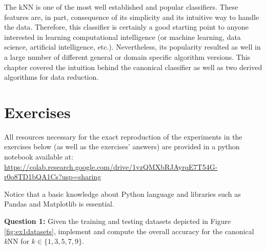 The kNN is one of the most well established and popular classifiers. These features are, in part, consequence of its simplicity and its intuitive way to handle the data. Therefore, this classifier is certainly a good starting point to anyone interested in learning computational intelligence (or machine learning, data science, artificial intelligence, etc.). Nevertheless, its popularity resulted as well in a large number of different general or domain specific algorithm versions. This chapter covered the intuition behind the canonical classifier as well as two derived algorithms for data reduction. 

\section{Exercises}

All resources necessary for the exact reproduction of the experiments in the exercises below (as well as the exercises' answers) are provided in a python notebook available at: \url{https://colab.research.google.com/drive/1vzQMXbRJAyrqE7T54G-r0o8TD1bQA1Cs?usp=sharing} 

\vspace{0.2cm}

Notice that a basic knowledge about Python language and libraries such as Pandas and Matplotlib is essential.

\vspace{0.2cm}

\noindent \textbf{Question 1:}  Given the training and testing datasets depicted in Figure \ref{fig:ex1datasets}, implement and compute the overall accuracy for the canonical \textit{k}NN for $k \in \{1, 3, 5, 7, 9\}$. 

